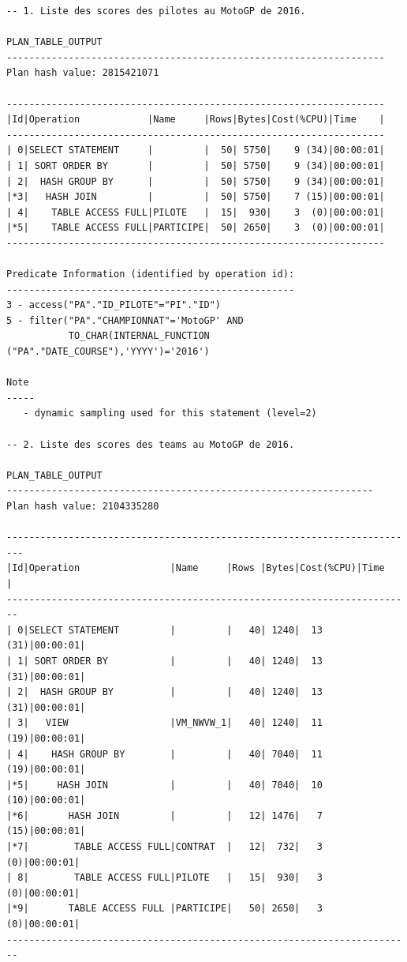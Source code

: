 \documentclass[12pt,a4paper]{article}
\newenvironment{code}{\captionsetup{type=listing}}{}
\begin{document}
\begin{code}
    \begin{verbatim}
-- 1. Liste des scores des pilotes au MotoGP de 2016.

PLAN_TABLE_OUTPUT
-------------------------------------------------------------------
Plan hash value: 2815421071

-------------------------------------------------------------------
|Id|Operation            |Name     |Rows|Bytes|Cost(%CPU)|Time    |
-------------------------------------------------------------------
| 0|SELECT STATEMENT     |         |  50| 5750|    9 (34)|00:00:01|
| 1| SORT ORDER BY       |         |  50| 5750|    9 (34)|00:00:01|
| 2|  HASH GROUP BY      |         |  50| 5750|    9 (34)|00:00:01|
|*3|   HASH JOIN         |         |  50| 5750|    7 (15)|00:00:01|
| 4|    TABLE ACCESS FULL|PILOTE   |  15|  930|    3  (0)|00:00:01|
|*5|    TABLE ACCESS FULL|PARTICIPE|  50| 2650|    3  (0)|00:00:01|
-------------------------------------------------------------------

Predicate Information (identified by operation id):
---------------------------------------------------
3 - access("PA"."ID_PILOTE"="PI"."ID")
5 - filter("PA"."CHAMPIONNAT"='MotoGP' AND
           TO_CHAR(INTERNAL_FUNCTION ("PA"."DATE_COURSE"),'YYYY')='2016')

Note
-----
   - dynamic sampling used for this statement (level=2)

-- 2. Liste des scores des teams au MotoGP de 2016.

PLAN_TABLE_OUTPUT
-----------------------------------------------------------------
Plan hash value: 2104335280

-------------------------------------------------------------------------
|Id|Operation                |Name     |Rows |Bytes|Cost(%CPU)|Time    |
------------------------------------------------------------------------
| 0|SELECT STATEMENT         |         |   40| 1240|  13  (31)|00:00:01|
| 1| SORT ORDER BY           |         |   40| 1240|  13  (31)|00:00:01|
| 2|  HASH GROUP BY          |         |   40| 1240|  13  (31)|00:00:01|
| 3|   VIEW                  |VM_NWVW_1|   40| 1240|  11  (19)|00:00:01|
| 4|    HASH GROUP BY        |         |   40| 7040|  11  (19)|00:00:01|
|*5|     HASH JOIN           |         |   40| 7040|  10  (10)|00:00:01|
|*6|       HASH JOIN         |         |   12| 1476|   7  (15)|00:00:01|
|*7|        TABLE ACCESS FULL|CONTRAT  |   12|  732|   3   (0)|00:00:01|
| 8|        TABLE ACCESS FULL|PILOTE   |   15|  930|   3   (0)|00:00:01|
|*9|       TABLE ACCESS FULL |PARTICIPE|   50| 2650|   3   (0)|00:00:01|
------------------------------------------------------------------------


\end{verbatim}
\end{code}
\end{document}
